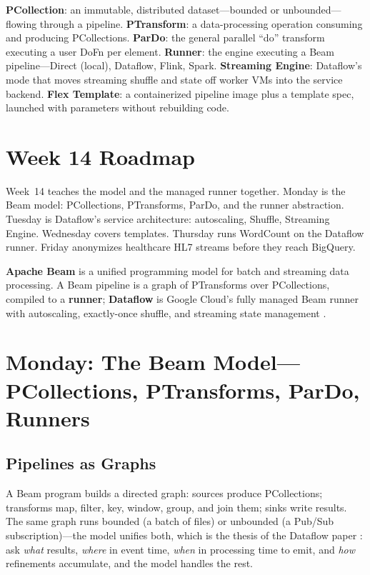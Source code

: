 \begin{keyterms}
\textbf{PCollection}: an immutable, distributed dataset---bounded or unbounded---flowing through a pipeline.
\textbf{PTransform}: a data-processing operation consuming and producing PCollections.
\textbf{ParDo}: the general parallel ``do'' transform executing a user DoFn per element.
\textbf{Runner}: the engine executing a Beam pipeline---Direct (local), Dataflow, Flink, Spark.
\textbf{Streaming Engine}: Dataflow's mode that moves streaming shuffle and state off worker VMs into the service backend.
\textbf{Flex Template}: a containerized pipeline image plus a template spec, launched with parameters without rebuilding code.
\end{keyterms}

\section{Week 14 Roadmap}
Week~14 teaches the model and the managed runner together. Monday is the Beam model: PCollections, PTransforms, ParDo, and the runner abstraction. Tuesday is Dataflow's service architecture: autoscaling, Shuffle, Streaming Engine. Wednesday covers templates. Thursday runs WordCount on the Dataflow runner. Friday anonymizes healthcare HL7 streams before they reach BigQuery.

\begin{definitionbox}
\textbf{Apache Beam} is a unified programming model for batch and streaming data processing. A Beam pipeline is a graph of PTransforms over PCollections, compiled to a \textbf{runner}; \textbf{Dataflow} is Google Cloud's fully managed Beam runner with autoscaling, exactly-once shuffle, and streaming state management \cite{apachebeamdocs,googleclouddataflowdocs}.
\end{definitionbox}

\section{Monday: The Beam Model---PCollections, PTransforms, ParDo, Runners}

\subsection{Pipelines as Graphs}
A Beam program builds a directed graph: sources produce PCollections; transforms map, filter, key, window, group, and join them; sinks write results. The same graph runs bounded (a batch of files) or unbounded (a Pub/Sub subscription)---the model unifies both, which is the thesis of the Dataflow paper \cite{akidau2015dataflow}: ask \emph{what} results, \emph{where} in event time, \emph{when} in processing time to emit, and \emph{how} refinements accumulate, and the model handles the rest.

